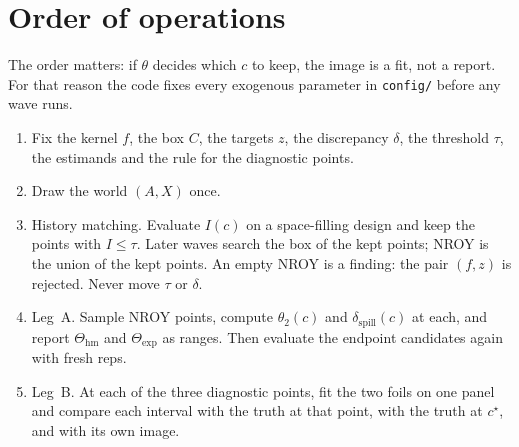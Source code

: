 \documentclass[11pt]{article}
\newcommand{\hm}{\mathrm{hm}}
\newcommand{\expset}{\mathrm{exp}}
\newcommand{\dspill}{\delta_{\mathrm{spill}}}
\begin{document}
\section{Order of operations}

The order matters: if $\theta$ decides which $c$ to keep, the image is a fit,
not a report. For that reason the code fixes every exogenous parameter
in \texttt{config/} before any wave runs.

\begin{enumerate}
  \item Fix the kernel $f$, the box $C$, the targets $z$, the
        discrepancy $\delta$, the threshold $\tau$, the estimands and
        the rule for the diagnostic points.
  \item Draw the world $(A,X)$ once.
  \item History matching. Evaluate $I(c)$ on a space-filling design and
        keep the points with $I\le\tau$. Later waves search the box of the kept
        points; NROY is the union of the kept points. An empty NROY
        is a finding: the pair $(f,z)$ is rejected. Never move $\tau$ or $\delta$.
  \item Leg~A. Sample \ThetaSample{} NROY points, compute $\theta_2(c)$ and $\dspill(c)$ at
        each, and report $\Theta_{\hm}$ and $\Theta_{\expset}$ as ranges. Then evaluate the
        endpoint candidates again with fresh reps.
  \item Leg~B. At each of the three diagnostic points, fit the two foils on one panel
        and compare each interval with the truth at that point, with the truth at
        $c^\star$, and with its own image.
\end{enumerate}
\end{document}

